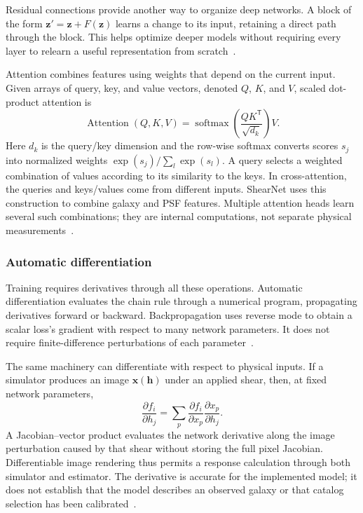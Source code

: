 Residual connections provide another way to organize deep networks. A block of the form $\boldsymbol{z}'=\boldsymbol{z}+F(\boldsymbol{z})$ learns a change to its input, retaining a direct path through the block. This helps optimize deeper models without requiring every layer to relearn a useful representation from scratch~\cite{he_deep_2016}.

Attention combines features using weights that depend on the current input. Given arrays of query, key, and value vectors, denoted $Q$, $K$, and $V$, scaled dot-product attention is
\begin{equation}
    \operatorname{Attention}(Q,K,V)=
    \operatorname{softmax}\!\left(\frac{QK^{\mathsf T}}{\sqrt{d_k}}\right)V.
    \label{eq:attention}
\end{equation}
Here $d_k$ is the query/key dimension and the row-wise softmax converts scores $s_j$ into normalized weights $\exp(s_j)/\sum_l\exp(s_l)$. A query selects a weighted combination of values according to its similarity to the keys. In cross-attention, the queries and keys/values come from different inputs. ShearNet uses this construction to combine galaxy and PSF features. Multiple attention heads learn several such combinations; they are internal computations, not separate physical measurements~\cite{vaswani_attention_2017,field_shearnet_2026}.

\subsubsection{Automatic differentiation}

Training requires derivatives through all these operations. Automatic differentiation evaluates the chain rule through a numerical program, propagating derivatives forward or backward. Backpropagation uses reverse mode to obtain a scalar loss's gradient with respect to many network parameters. It does not require finite-difference perturbations of each parameter~\cite{baydin_automatic_2018}.

The same machinery can differentiate with respect to physical inputs. If a simulator produces an image $\boldsymbol{x}(\boldsymbol{h})$ under an applied shear, then, at fixed network parameters,
\begin{equation}
    \frac{\partial f_i}{\partial h_j}
    =\sum_p\frac{\partial f_i}{\partial x_p}
              \frac{\partial x_p}{\partial h_j}.
    \label{eq:differentiable-response}
\end{equation}
A Jacobian--vector product evaluates the network derivative along the image perturbation caused by that shear without storing the full pixel Jacobian. Differentiable image rendering thus permits a response calculation through both simulator and estimator. The derivative is accurate for the implemented model; it does not establish that the model describes an observed galaxy or that catalog selection has been calibrated~\cite{baydin_automatic_2018,field_shearnet_2026}.
